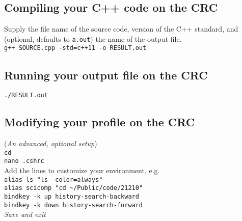 \subsection{Compiling your C++ code on the CRC}
Supply the file name of the source code, version of the C++ standard, and (optional, defaults to {\tt a.out}) the name of the output file.
\\
{\tt g++ SOURCE.cpp -std=c++11 -o RESULT.out}

\subsection{Running your output file on the CRC}

{\tt ./RESULT.out}

\subsection{Modifying your profile on the CRC}
({\it An advanced, optional setup})\\
{\tt cd}
\\ {\tt nano .cshrc}
\\ Add the lines to customize your environment, e.g.
\\ {\tt alias ls "ls --color=always"}
\\ {\tt alias scicomp "cd \sim\textnormal{/Public/code/21210"}}
\\ {\tt bindkey -k up history-search-backward}
\\ {\tt bindkey -k down history-search-forward}
\\\textnormal{{\it Save and exit}}




